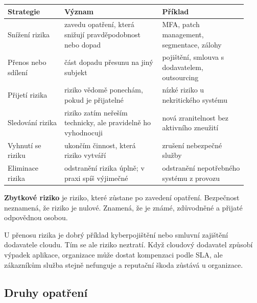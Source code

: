 \begin{longtable}{p{0.22\linewidth}p{0.38\linewidth}p{0.33\linewidth}}
\toprule
\textbf{Strategie} & \textbf{Význam} & \textbf{Příklad} \\
\midrule\endhead
Snížení rizika & zavedu opatření, která snižují pravděpodobnost nebo dopad & MFA, patch management, segmentace, zálohy \\
Přenos nebo sdílení & část dopadu přesunu na jiný subjekt & pojištění, smlouva s dodavatelem, outsourcing \\
Přijetí rizika & riziko vědomě ponechám, pokud je přijatelné & nízké riziko u nekritického systému \\
Sledování rizika & riziko zatím neřeším technicky, ale pravidelně ho vyhodnocuji & nová zranitelnost bez aktivního zneužití \\
Vyhnutí se riziku & ukončím činnost, která riziko vytváří & zrušení nebezpečné služby \\
Eliminace rizika & odstranění rizika úplně; v praxi spíš výjimečné & odstranění nepotřebného systému z provozu \\
\bottomrule
\end{longtable}

\textbf{Zbytkové riziko} je riziko, které zůstane po zavedení opatření. Bezpečnost neznamená, že riziko je nulové. Znamená, že je známé, zdůvodněné a přijaté odpovědnou osobou.


U přenosu rizika je dobrý příklad kyberpojištění nebo smluvní zajištění dodavatele cloudu. Tím se ale riziko neztratí. Když cloudový dodavatel způsobí výpadek aplikace, organizace může dostat kompenzaci podle SLA, ale zákazníkům služba stejně nefunguje a reputační škoda zůstává u organizace.

\subsection*{Druhy opatření}

